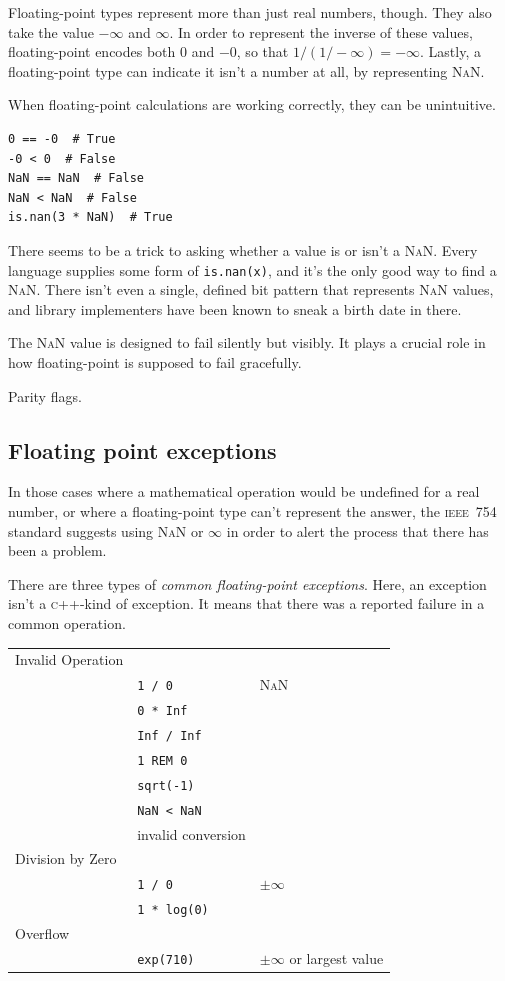 \documentclass[fleqn,10pt]{olplainarticle}
\newcommand{\cpp}{\textsc{c}++\xspace}
\newcommand{\nan}{\textsc{NaN}\xspace}
\newcommand{\ieee}{\textsc{ieee}\xspace}
\begin{document}
Floating-point types represent more than just real numbers, though. They
also take the value $-\infty$ and $\infty$. In order to represent the inverse
of these values, floating-point encodes both $0$ and $-0$, so that $1/(1 / -\infty)=-\infty$.
Lastly, a floating-point type can indicate it isn't a number at all,
by representing \nan.

When floating-point calculations are working correctly, they can
be unintuitive.

\begin{lstlisting}
0 == -0  # True
-0 < 0  # False
NaN == NaN  # False
NaN < NaN  # False
is.nan(3 * NaN)  # True
\end{lstlisting}

There seems to be a trick to asking whether a value is
or isn't a \nan. Every language supplies some form of \lstinline|is.nan(x)|,
and it's the only good way to find a \nan. There isn't even a single,
defined bit pattern that represents \nan values, and library implementers
have been known to sneak a birth date in there.

The \nan value is designed to fail silently but visibly. It plays
a crucial role in how floating-point is supposed to fail gracefully.

Parity flags.

\subsection{Floating point exceptions}

In those cases where a mathematical operation would be undefined
for a real number, or where a floating-point type can't represent
the answer, the \ieee~754 standard suggests using \nan or $\infty$ in order
to alert the process that there has been a problem.

There are three types of \emph{common floating-point exceptions}.
Here, an exception isn't a \cpp{}-kind of exception. It means that
there was a reported failure in a common operation.

\begin{tabular}{lll}
Invalid Operation & & \\
 & \lstinline|1 / 0| & \nan \\
 & \lstinline|0 * Inf| & \\
 & \lstinline|Inf / Inf| & \\
 & \lstinline|1 REM 0| & \\
 & \lstinline|sqrt(-1)| & \\
 & \lstinline|NaN < NaN| & \\
 & invalid conversion & \\
Division by Zero & & \\
 & \lstinline|1 / 0| & $\pm\infty$ \\
 & \lstinline|1 * log(0)| & \\
Overflow & & \\
 & \lstinline|exp(710)| & $\pm\infty$ or largest value\\
\end{tabular}
\end{document}
